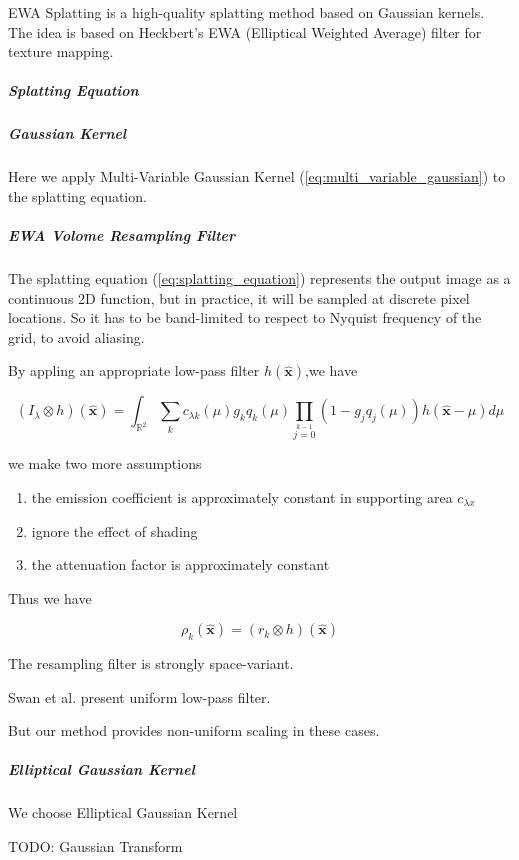 EWA Splatting \cite{zwickerEWAVolumeSplatting2001} \cite{zwickerEWASplatting2002} 
is a high-quality splatting method based on Gaussian kernels.
The idea is based on Heckbert's EWA (Elliptical Weighted Average) filter for texture mapping.

\subparagraph{Splatting Equation}



\subparagraph{Gaussian Kernel}

Here we apply Multi-Variable Gaussian Kernel (\ref{eq:multi_variable_gaussian}) to the splatting equation.



\subparagraph{EWA Volome Resampling Filter}

The splatting equation (\ref{eq:splatting_equation}) represents the output image as a continuous 2D function, 
but in practice, it will be sampled at discrete pixel locations. So it has to be band-limited to respect to Nyquist frequency of the grid, to avoid aliasing.

By appling an appropriate low-pass filter $h(\hat{\mathbf{x}})$,we have 

$$(I_\lambda \otimes h)(\hat{\mathbf{x}})=
    \int_{\mathbb{R}^2}\sum\limits_{k }\limits^{} 
    c_{\lambda k}(\mu)g_kq_k(\mu)\prod\limits_{j=0}\limits^{k-1} 
    (1-g_jq_j(\mu))h(\hat{\mathbf{x}}-\mu)d\mu $$

we make two more assumptions

\begin{enumerate}
    \item the emission coefficient is approximately constant in supporting area $c_{\lambda x}$
    \item ignore the effect of shading 
    \item the attenuation factor is approximately constant 
\end{enumerate}

Thus we have 

$$\rho_k(\hat{\mathbf{x}})=(r_k \otimes h)(\hat{\mathbf{x}})$$

The resampling filter is strongly space-variant.

Swan et al. present uniform low-pass filter.

But our method provides non-uniform scaling in these cases.

\subparagraph{Elliptical Gaussian Kernel}

We choose Elliptical Gaussian Kernel 

TODO: Gaussian Transform